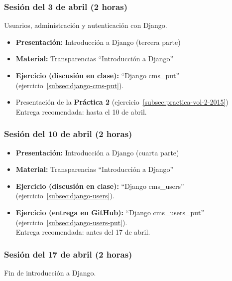\documentclass[a4paper,12pt]{article}
\begin{document}
\subsubsection{Sesión del 3 de abril (2 horas)}

Usuarios, administración y autenticación con Django.

\begin{itemize}
 \item \textbf{Presentación:} Introducción a Django (tercera parte)
 \item \textbf{Material:} Transparencias ``Introducción a Django''
 \item \textbf{Ejercicio (discusión en clase):} ``Django cms\_put'' (ejercicio~\ref{subsec:django-cms-put}).
 \item Presentación de la \textbf{Práctica 2} (ejercicio~\ref{subsec:practica-vol-2-2015}) \\
  Entrega recomendada: hasta el 10 de abril.
\end{itemize}


\subsubsection{Sesión del 10 de abril (2 horas)}

\begin{itemize}
 \item \textbf{Presentación:} Introducción a Django (cuarta parte)
 \item \textbf{Material:} Transparencias ``Introducción a Django''
  \item \textbf{Ejercicio (discusión en clase):} ``Django cms\_users'' (ejercicio~\ref{subsec:django-users}).
    \item \textbf{Ejercicio (entrega en GitHub):} ``Django cms\_users\_put'' (ejercicio~\ref{subsec:django-users-put}). \\
  Entrega recomendada: antes del 17 de abril.
\end{itemize}


\subsubsection{Sesión del 17 de abril (2 horas)}

Fin de introducción a Django. %
\end{document}
